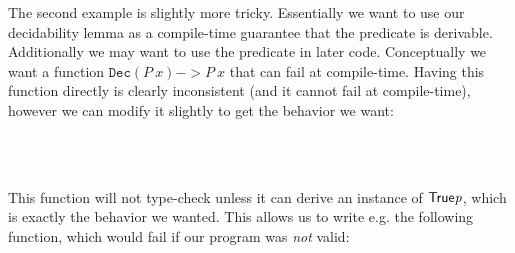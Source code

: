 The second example is slightly more tricky. Essentially we want to use our
decidability lemma as a compile-time guarantee that the predicate is
derivable. Additionally we may want to use the predicate in later
code. Conceptually we want a function $\mathtt{Dec}(P\ x) -> P\ x$ that can fail at compile-time. Having this function directly is clearly inconsistent (and it cannot fail at compile-time), however we can modify it slightly to get the behavior we want:

\begin{code}
\> \AgdaSymbol{:}  \AgdaSymbol{\{}\AgdaSymbol{\}} \AgdaSymbol{\{} \AgdaSymbol{:}  \AgdaSymbol{\}} \<%
\\
\>[13]\<[14]%
\>[14]\AgdaSymbol{(} \AgdaSymbol{:}  \AgdaSymbol{)}  \AgdaSymbol{\{}\AgdaBound{\_} \AgdaSymbol{:}  \AgdaSymbol{\}} \<%
\\
\>[13]\<[14]%
\>[14]\<%
\end{code}

This function will not type-check unless it can derive an instance of
$\AgdaFunction{True} \AgdaBound{p}$, which is exactly the behavior we
wanted. This allows us to write e.g. the following function, which would fail if
our program was \emph{not} valid:

\begin{code}
\> \AgdaSymbol{:}   \<%
\\
\> \AgdaSymbol{=}  \AgdaSymbol{(} \AgdaSymbol{\_)}\<%
\end{code}
